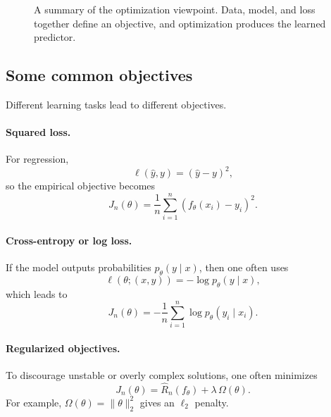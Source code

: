 \begin{figure}[tbp]
\centering
{}
\caption{A summary of the optimization viewpoint. Data, model, and loss together define an objective, and optimization produces the learned predictor.}
\end{figure}

\subsection*{Some common objectives}

Different learning tasks lead to different objectives.

\paragraph{Squared loss.}
For regression,
\[
\ell(\hat y,y)=(\hat y-y)^2,
\]
so the empirical objective becomes
\[
J_n(\theta)=\frac1n\sum_{i=1}^n (f_\theta(x_i)-y_i)^2.
\]

\paragraph{Cross-entropy or log loss.}
If the model outputs probabilities $p_\theta(y\mid x)$, then one often uses
\[
\ell(\theta;(x,y))=-\log p_\theta(y\mid x),
\]
which leads to
\[
J_n(\theta)=-\frac1n\sum_{i=1}^n \log p_\theta(y_i\mid x_i).
\]

\paragraph{Regularized objectives.}
To discourage unstable or overly complex solutions, one often minimizes
\[
J_n(\theta)=\widehat R_n(f_\theta)+\lambda\,\Omega(\theta).
\]
For example, $\Omega(\theta)=\|\theta\|_2^2$ gives an $\ell_2$ penalty.

